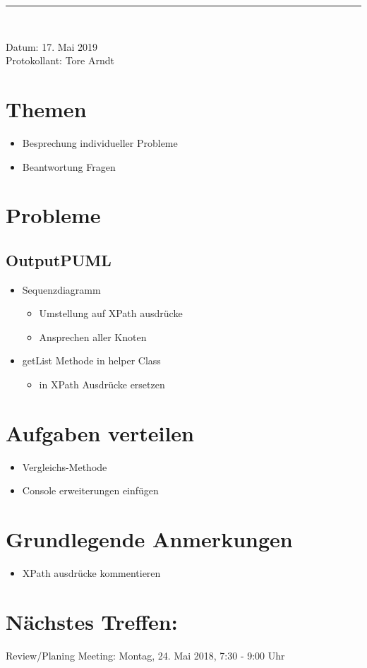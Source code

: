 \begin{center}  
\vspace{0.5pt}\nointerlineskip\rule{\textwidth}{0.2pt}\\ 
\vspace{0.5pt}\nointerlineskip
\end{center} 
\large Datum: 17. Mai 2019\vspace{3pt}\\\large Protokollant: Tore Arndt
\section*{Themen}
\begin{itemize}
\item Besprechung individueller Probleme
\item Beantwortung Fragen
\end{itemize}
\section*{Probleme}
\subsection*{OutputPUML}
\begin{itemize}
\item Sequenzdiagramm
\begin{itemize}
\item Umstellung auf XPath ausdrücke
\item Ansprechen aller Knoten
\end{itemize}
\item getList Methode in helper Class
\begin{itemize}
\item in XPath Ausdrücke ersetzen
\end{itemize}
\end{itemize}
\section*{Aufgaben verteilen}
\begin{itemize}
\item Vergleichs-Methode
\item Console erweiterungen einfügen
\end{itemize}
\section*{Grundlegende Anmerkungen}
\begin{itemize}
\item XPath ausdrücke kommentieren
\end{itemize}
\section*{Nächstes Treffen:}
Review/Planing Meeting: Montag, 24. Mai 2018, 7:30 - 9:00 Uhr
